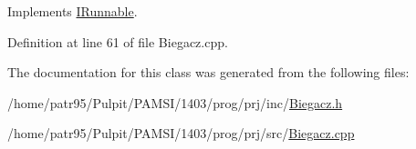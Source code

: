 Implements \hyperlink{class_i_runnable_ae022a87afe9509ad08d21cda36a4e357}{I\-Runnable}.



Definition at line 61 of file Biegacz.\-cpp.



The documentation for this class was generated from the following files\-:\begin{DoxyCompactItemize}
\item 
/home/patr95/\-Pulpit/\-P\-A\-M\-S\-I/1403/prog/prj/inc/\hyperlink{_biegacz_8h}{Biegacz.\-h}\item 
/home/patr95/\-Pulpit/\-P\-A\-M\-S\-I/1403/prog/prj/src/\hyperlink{_biegacz_8cpp}{Biegacz.\-cpp}\end{DoxyCompactItemize}
